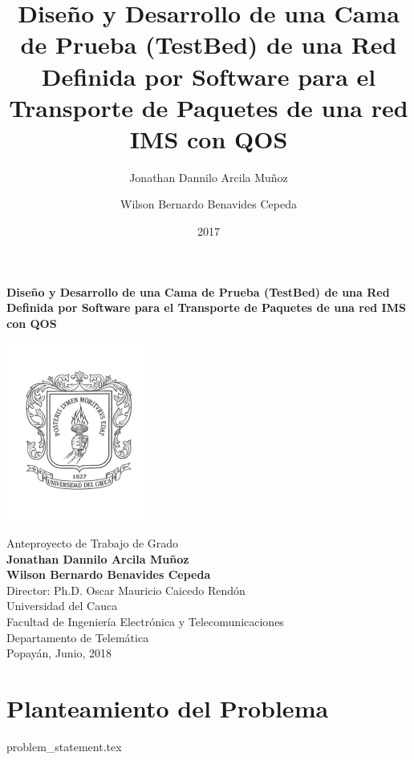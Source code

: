 \documentclass[11pt, letterpaper]{article}
\title{Diseño y Desarrollo de una Cama de Prueba (TestBed) de una Red Definida por Software para el Transporte de Paquetes de una red IMS con QOS}
\author{
    Jonathan Dannilo Arcila Muñoz
\and
	Wilson Bernardo Benavides Cepeda    
}
\date{2017}
\begin{document}


\begin{titlepage}
\thispagestyle{empty}
\centering

\LARGE{\textbf{Diseño y Desarrollo de una Cama de Prueba (TestBed) de una Red Definida por Software para el Transporte de Paquetes de una red IMS con QOS}}\\
\vspace{1.8cm}

\includegraphics[scale=1]{logo-unicauca.png}

\begin{center}
\Large
\vspace{8mm}
Anteproyecto de Trabajo de Grado\\
\vspace{1.2cm}
\textbf{Jonathan Dannilo Arcila Muñoz \\
Wilson Bernardo Benavides Cepeda}\\
\vspace{1.2cm}
Director: Ph.D. Oscar Mauricio Caicedo Rendón\\


\vfill
Universidad del Cauca\\
Facultad de Ingeniería Electrónica y Telecomunicaciones\\
Departamento de Telemática\\
Popayán, Junio, 2018

\end{center}
\end{titlepage}

\pagestyle{plain}
\setcounter{page}{3}
\tableofcontents
\break


\section{Planteamiento del Problema}
	{problem_statement.tex}


%

\end{document}
